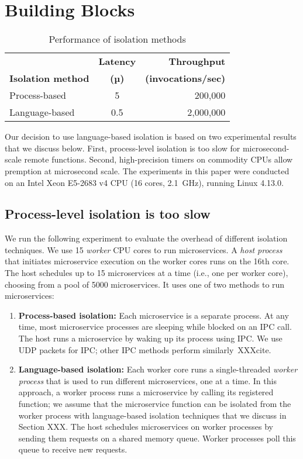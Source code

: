 \section{Building Blocks}
\label{sec:motive}

\begin{table}
\begin{center}
\small
\begin{tabular}{lcr}
   & \textbf{Latency} & \textbf{Throughput} \\
  \textbf{Isolation method} & \textbf{(µ)} & \textbf{(invocations/sec)} \\
\midrule
Process-based & 5 & 200,000 \\
Language-based & 0.5 & 2,000,000 \\
\end{tabular}
\caption{Performance of isolation methods}
\label{tab:isolation_methods}
\end{center}
\end{table}

Our decision to use language-based isolation is based on two experimental
results that we discuss below. First, process-level isolation is too slow for
microsecond-scale remote functions. Second, high-precision timers on commodity
CPUs allow premption at microsecond scale. The experiments in this paper were
conducted on an Intel Xeon E5-2683 v4 CPU (16 cores, 2.1~GHz), running
Linux 4.13.0.

\subsection{Process-level isolation is too slow}
We run the following experiment to evaluate the overhead of different isolation
techniques. We use 15 \emph{worker} CPU cores to run microservices. A \emph{host
process} that initiates microservice execution on the worker cores runs on the
16th core. The host schedules up to 15 microservices at a time (i.e., one
per worker core), choosing from a pool of 5000 microservices. It uses one of two
methods to run microservices:

\begin{enumerate}
\item \textbf{Process-based isolation:} Each microservice is a separate process.
At any time, most microservice processes are sleeping while blocked on an IPC
call. The host runs a microservice by waking up its process using IPC. We use
UDP packets for IPC; other IPC methods perform similarly~XXXcite.
\item \textbf{Language-based isolation:} Each worker core runs a single-threaded
\emph{worker process} that is used to run different microservices, one at a time.
In this approach, a worker process runs a microservice by calling its registered
function; we assume that the microservice function can be isolated from the
worker process with language-based isolation techniques that we discuss in
Section XXX. The host schedules microservices on worker processes by sending them
requests on a shared memory queue. Worker processes poll this queue to receive
new requests.
\end{enumerate}

